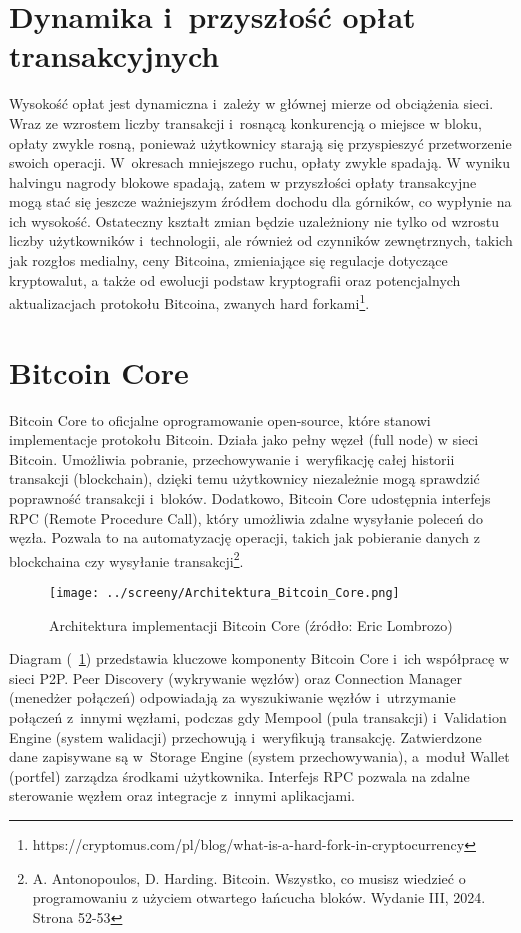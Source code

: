\documentclass[12pt,a4paper]{report}
\theoremstyle{definition} %
\begin{document}
	\section{Dynamika i~przyszłość opłat transakcyjnych}
	\hspace*{\parindent}Wysokość opłat jest dynamiczna i~zależy w głównej mierze od obciążenia sieci. Wraz ze wzrostem liczby transakcji i~rosnącą konkurencją o miejsce w bloku, opłaty zwykle rosną, ponieważ użytkownicy starają się przyspieszyć przetworzenie swoich operacji. W~okresach mniejszego ruchu, opłaty zwykle spadają. W wyniku halvingu 			nagrody blokowe 	spadają, zatem w przyszłości opłaty transakcyjne mogą stać się jeszcze ważniejszym źródłem dochodu dla górników, co wypłynie na ich wysokość. Ostateczny kształt zmian będzie uzależniony nie tylko od wzrostu liczby użytkowników i~technologii, ale również od czynników zewnętrznych, takich jak rozgłos medialny, ceny Bitcoina, zmieniające się regulacje dotyczące kryptowalut, a także od ewolucji podstaw kryptografii oraz potencjalnych aktualizacjach protokołu Bitcoina, zwanych hard forkami\footnote{https://cryptomus.com/pl/blog/what-is-a-hard-fork-in-cryptocurrency}.  
	\section{Bitcoin Core}
	\hspace*{\parindent} Bitcoin Core to oficjalne oprogramowanie open-source, które stanowi implementacje protokołu Bitcoin. Działa jako pełny węzeł (full node) w sieci Bitcoin. Umożliwia pobranie, przechowywanie i~weryfikację całej historii transakcji (blockchain), dzięki temu użytkownicy niezależnie mogą sprawdzić poprawność transakcji i~bloków. 			Dodatkowo, Bitcoin Core udostępnia interfejs RPC (Remote Procedure Call), który umożliwia zdalne wysyłanie poleceń do węzła. Pozwala to na automatyzację operacji, takich jak pobieranie danych z blockchaina czy wysyłanie transakcji\footnote{A. Antonopoulos, D. Harding. Bitcoin. Wszystko, co musisz wiedzieć o programowaniu z użyciem 				otwartego łańcucha bloków. Wydanie III, 2024. Strona 52-53}.
	\begin{figure}[H]
	    \centering
	    \texttt{[image: ../screeny/Architektura\_Bitcoin\_Core.png]} 
	    \caption{Architektura implementacji Bitcoin Core (źródło: Eric Lombrozo\protect\footnotemark)}
	    \label{fig:architektura}
	\end{figure}
	Diagram (\figurename~\ref{fig:architektura}) przedstawia kluczowe komponenty Bitcoin Core i~ich współpracę w sieci P2P. Peer Discovery (wykrywanie węzłów) oraz Connection Manager (menedżer połączeń) odpowiadają za wyszukiwanie węzłów i~utrzymanie połączeń z~innymi węzłami, podczas gdy Mempool (pula transakcji) i~Validation Engine (system walidacji) przechowują i~weryfikują transakcję. Zatwierdzone dane zapisywane są w~Storage Engine (system przechowywania), a~moduł Wallet (portfel) zarządza środkami użytkownika. Interfejs RPC pozwala na zdalne sterowanie węzłem oraz integracje z~innymi aplikacjami.
	
\end{document}
